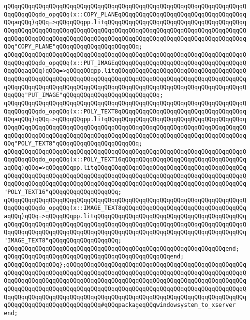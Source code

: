 \verb|qQQqqQQqqQQqqQQqqQQqqQQqqQQqqQQqqQQqqQQqqQQqqQQqqQQqqQQqqQQqqQQqqQQqqQQqqQQqqQQqdo_opqQQq(x::COPY_PLANEqQQqqQQqqQQqqQQqqQQqqQQqqQQqqQQqqQQqqQQqaqQQq)qQQq=>qQQqqQQqpp.litqQQqqQQqqQQqqQQqqQQqqQQqqQQqqQQqqQQqqQQqqQQqqQQqqQQqqQQqqQQqqQQqqQQqqQQqqQQqqQQqqQQqqQQqqQQqqQQqqQQqqQQqqQQqqQQqqQQqqQQqqQQqqQQqqQQqqQQqqQQqqQQqqQQqqQQqqQQqqQQqqQQqqQQqqQQqqQQqqQQqqQQq"COPY_PLANE"qQQqqQQqqQQqqQQqqQQqqQQq;|\newline
\verb|qQQqqQQqqQQqqQQqqQQqqQQqqQQqqQQqqQQqqQQqqQQqqQQqqQQqqQQqqQQqqQQqqQQqqQQqqQQqqQQqdo_opqQQq(x::PUT_IMAGEqQQqqQQqqQQqqQQqqQQqqQQqqQQqqQQqqQQqqQQqqQQqaqQQq)qQQq=>qQQqqQQqpp.litqQQqqQQqqQQqqQQqqQQqqQQqqQQqqQQqqQQqqQQqqQQqqQQqqQQqqQQqqQQqqQQqqQQqqQQqqQQqqQQqqQQqqQQqqQQqqQQqqQQqqQQqqQQqqQQqqQQqqQQqqQQqqQQqqQQqqQQqqQQqqQQqqQQqqQQqqQQqqQQqqQQqqQQqqQQqqQQqqQQqqQQq"PUT_IMAGE"qQQqqQQqqQQqqQQqqQQqqQQqqQQq;|\newline
\verb|qQQqqQQqqQQqqQQqqQQqqQQqqQQqqQQqqQQqqQQqqQQqqQQqqQQqqQQqqQQqqQQqqQQqqQQqqQQqqQQqdo_opqQQq(x::POLY_TEXT8qQQqqQQqqQQqqQQqqQQqqQQqqQQqqQQqqQQqqQQqaqQQq)qQQq=>qQQqqQQqpp.litqQQqqQQqqQQqqQQqqQQqqQQqqQQqqQQqqQQqqQQqqQQqqQQqqQQqqQQqqQQqqQQqqQQqqQQqqQQqqQQqqQQqqQQqqQQqqQQqqQQqqQQqqQQqqQQqqQQqqQQqqQQqqQQqqQQqqQQqqQQqqQQqqQQqqQQqqQQqqQQqqQQqqQQqqQQqqQQqqQQqqQQq"POLY_TEXT8"qQQqqQQqqQQqqQQqqQQqqQQq;|\newline
\verb|qQQqqQQqqQQqqQQqqQQqqQQqqQQqqQQqqQQqqQQqqQQqqQQqqQQqqQQqqQQqqQQqqQQqqQQqqQQqqQQqdo_opqQQq(x::POLY_TEXT16qQQqqQQqqQQqqQQqqQQqqQQqqQQqqQQqqQQqaqQQq)qQQq=>qQQqqQQqpp.litqQQqqQQqqQQqqQQqqQQqqQQqqQQqqQQqqQQqqQQqqQQqqQQqqQQqqQQqqQQqqQQqqQQqqQQqqQQqqQQqqQQqqQQqqQQqqQQqqQQqqQQqqQQqqQQqqQQqqQQqqQQqqQQqqQQqqQQqqQQqqQQqqQQqqQQqqQQqqQQqqQQqqQQqqQQqqQQqqQQqqQQq"POLY_TEXT16"qQQqqQQqqQQqqQQqqQQq;|\newline
\verb|qQQqqQQqqQQqqQQqqQQqqQQqqQQqqQQqqQQqqQQqqQQqqQQqqQQqqQQqqQQqqQQqqQQqqQQqqQQqqQQqdo_opqQQq(x::IMAGE_TEXT8qQQqqQQqqQQqqQQqqQQqqQQqqQQqqQQqqQQqaqQQq)qQQq=>qQQqqQQqpp.litqQQqqQQqqQQqqQQqqQQqqQQqqQQqqQQqqQQqqQQqqQQqqQQqqQQqqQQqqQQqqQQqqQQqqQQqqQQqqQQqqQQqqQQqqQQqqQQqqQQqqQQqqQQqqQQqqQQqqQQqqQQqqQQqqQQqqQQqqQQqqQQqqQQqqQQqqQQqqQQqqQQqqQQqqQQqqQQqqQQqqQQq"IMAGE_TEXT8"qQQqqQQqqQQqqQQqqQQq;|\newline
\verb|qQQqqQQqqQQqqQQqqQQqqQQqqQQqqQQqqQQqqQQqqQQqqQQqqQQqqQQqqQQqqQQqend;|\newline
\verb|qQQqqQQqqQQqqQQqqQQqqQQqqQQqqQQqqQQqqQQqqQQqqQQqend;|\newline
\verb|qQQqqQQqqQQqqQQq};qQQqqQQqqQQqqQQqqQQqqQQqqQQqqQQqqQQqqQQqqQQqqQQqqQQqqQQqqQQqqQQqqQQqqQQqqQQqqQQqqQQqqQQqqQQqqQQqqQQqqQQqqQQqqQQqqQQqqQQqqQQqqQQqqQQqqQQqqQQqqQQqqQQqqQQqqQQqqQQqqQQqqQQqqQQqqQQqqQQqqQQqqQQqqQQqqQQqqQQqqQQqqQQqqQQqqQQqqQQqqQQqqQQqqQQqqQQqqQQqqQQqqQQqqQQqqQQqqQQqqQQqqQQqqQQqqQQqqQQqqQQqqQQqqQQqqQQqqQQqqQQqqQQqqQQqqQQqqQQqqQQqqQQqqQQqqQQqqQQqqQQqqQQqqQQqqQQqqQQq#qQQqpackageqQQqwindowsystem_to_xserver|\newline
\verb|end;|\newline
\newline
\newline
\newline
\newline

